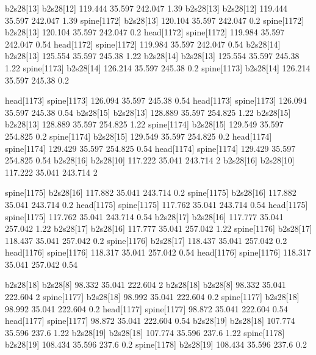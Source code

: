 b2s28[13]    b2s28[12]    119.444    35.597    242.047    1.39
b2s28[13]    b2s28[12]    119.444    35.597    242.047    1.39
spine[1172]    b2s28[13]    120.104    35.597    242.047    0.2
spine[1172]    b2s28[13]    120.104    35.597    242.047    0.2
head[1172]    spine[1172]    119.984    35.597    242.047    0.54
head[1172]    spine[1172]    119.984    35.597    242.047    0.54
b2s28[14]    b2s28[13]    125.554    35.597    245.38    1.22
b2s28[14]    b2s28[13]    125.554    35.597    245.38    1.22
spine[1173]    b2s28[14]    126.214    35.597    245.38    0.2
spine[1173]    b2s28[14]    126.214    35.597    245.38    0.2


head[1173]    spine[1173]    126.094    35.597    245.38    0.54
head[1173]    spine[1173]    126.094    35.597    245.38    0.54
b2s28[15]    b2s28[13]    128.889    35.597    254.825    1.22
b2s28[15]    b2s28[13]    128.889    35.597    254.825    1.22
spine[1174]    b2s28[15]    129.549    35.597    254.825    0.2
spine[1174]    b2s28[15]    129.549    35.597    254.825    0.2
head[1174]    spine[1174]    129.429    35.597    254.825    0.54
head[1174]    spine[1174]    129.429    35.597    254.825    0.54
b2s28[16]    b2s28[10]    117.222    35.041    243.714    2
b2s28[16]    b2s28[10]    117.222    35.041    243.714    2


spine[1175]    b2s28[16]    117.882    35.041    243.714    0.2
spine[1175]    b2s28[16]    117.882    35.041    243.714    0.2
head[1175]    spine[1175]    117.762    35.041    243.714    0.54
head[1175]    spine[1175]    117.762    35.041    243.714    0.54
b2s28[17]    b2s28[16]    117.777    35.041    257.042    1.22
b2s28[17]    b2s28[16]    117.777    35.041    257.042    1.22
spine[1176]    b2s28[17]    118.437    35.041    257.042    0.2
spine[1176]    b2s28[17]    118.437    35.041    257.042    0.2
head[1176]    spine[1176]    118.317    35.041    257.042    0.54
head[1176]    spine[1176]    118.317    35.041    257.042    0.54


b2s28[18]    b2s28[8]    98.332    35.041    222.604    2
b2s28[18]    b2s28[8]    98.332    35.041    222.604    2
spine[1177]    b2s28[18]    98.992    35.041    222.604    0.2
spine[1177]    b2s28[18]    98.992    35.041    222.604    0.2
head[1177]    spine[1177]    98.872    35.041    222.604    0.54
head[1177]    spine[1177]    98.872    35.041    222.604    0.54
b2s28[19]    b2s28[18]    107.774    35.596    237.6    1.22
b2s28[19]    b2s28[18]    107.774    35.596    237.6    1.22
spine[1178]    b2s28[19]    108.434    35.596    237.6    0.2
spine[1178]    b2s28[19]    108.434    35.596    237.6    0.2


